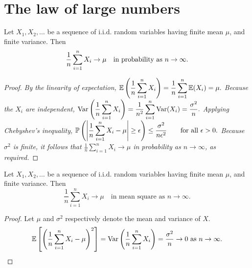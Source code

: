 \section{The law of large numbers}
\begin{theorem}\label{thm:wlln}
Let $X_1,X_2,\ldots$ be a sequence of i.i.d. random variables having finite mean $\mu$, and finite variance. Then
\[
\frac{1}{n}\sum_{i=1}^n X_i \to \mu \text{\quad in probability as\ } n\to\infty.
\]
\end{theorem}

\begin{proof}
\small
\bit
\it 
By the linearity of expectation,
$
\displaystyle\mathbb{E}\left(\frac{1}{n}\sum_{i=1}^n X_i\right)	= \frac{1}{n}\sum_{i=1}^n \mathbb{E}(X_i)= \mu.
$
\it
Because the $X_i$ are independent,
$
\displaystyle\text{Var}\left(\frac{1}{n}\sum_{i=1}^n X_i\right)	= \frac{1}{n^2}\sum_{i=1}^n \text{Var}(X_i) = \frac{\sigma^2}{n}.
$
\it
Applying Chebyshev's inequality,
$
\displaystyle\mathbb{P}\left(\left|\frac{1}{n}\sum_{i=1}^n X_i - \mu\right| \geq \epsilon\right) \leq \frac{\sigma^2}{n\epsilon^2} \qquad\text{for all $\epsilon>0$.}
$
\eit
Because $\sigma^2$ is finite, it follows that $\displaystyle\frac{1}{n}\sum_{i=1}^n X_i\to\mu$ in probability as $n\to\infty$, as required.
\normalsize
\end{proof}


\begin{theorem}\label{thm:lln-msq}
Let $X_1,X_2,\ldots$ be a sequence of i.i.d. random variables having finite mean $\mu$, and finite variance. Then
\[
\frac{1}{n}\sum_{i=1}^n X_i \to \mu \quad\text{in mean square as } n\to\infty.
\]
\end{theorem}

\begin{proof}
Let $\mu$ and $\sigma^2$ respectively denote the mean and variance of $X$.
\[
\mathbb{E}\left[\left(\frac{1}{n}\sum_{i=1}^n X_i - \mu\right)^2\right] 
	= \text{Var}\left(\frac{1}{n}\sum_{i=1}^n X_i\right) = \frac{\sigma^2}{n}\to 0 \text{ as } n\to\infty.
\]
\end{proof}

